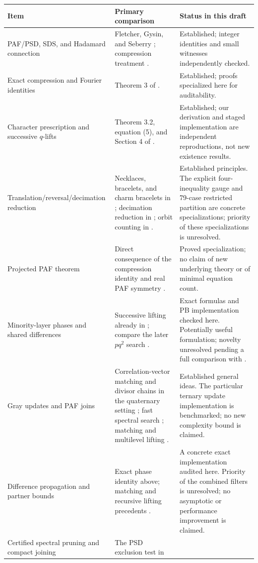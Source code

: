 \documentclass[11pt]{article}
\begin{document}
\begin{longtable}{p{.22\linewidth}p{.35\linewidth}p{.35\linewidth}}
\toprule
Item & Primary comparison & Status in this draft\\\midrule
\endhead
PAF/PSD, SDS, and Hadamard connection & Fletcher, Gysin, and Seberry
\cite{fletcher}; compression treatment \cite{compression}. & Established;
integer identities and small witnesses independently checked.\\
Exact compression and Fourier identities & Theorem 3 of
\cite{compression}. & Established; proofs specialized here for auditability.\\
Character prescription and successive $q$-lifts & Theorem 3.2, equation (5),
and Section 4 of \cite{issac}. & Established; our derivation and staged
implementation are independent reproductions, not new existence results.\\
Translation/reversal/decimation reduction & Necklaces, bracelets, and charm
bracelets in \cite{compression}; decimation reduction in \cite{issac};
orbit counting in \cite{turner}. & Established principles. The explicit
four-inequality gauge and 79-case restricted partition are concrete
specializations; priority of these specializations is unresolved.\\
Projected PAF theorem & Direct consequence of the compression identity and
real PAF symmetry \cite{compression}. & Proved specialization; no claim of
new underlying theory or of minimal equation count.\\
Minority-layer phases and shared differences & Successive lifting already
in \cite{issac}; compare the later $pq^2$ search \cite{pq2}. & Exact formulas
and PB implementation checked here. Potentially useful formulation;
novelty unresolved pending a full comparison with \cite{pq2}.\\
Gray updates and PAF joins & Correlation-vector matching and divisor chains
in the quaternary setting \cite{lebedev}; fast spectral search
\cite{perera}; matching and multilevel lifting \cite{lumsden}. & Established general ideas. The particular ternary update
implementation is benchmarked; no new complexity bound is claimed.\\
Difference propagation and partner bounds & Exact phase identity above;
matching and recursive lifting precedents \cite{issac,lumsden}. & A concrete
exact implementation audited here. Priority of the combined filters is
unresolved; no asymptotic or performance improvement is claimed.\\
Certified spectral pruning and compact joining & The PSD exclusion test in

\end{longtable}
\end{document}
